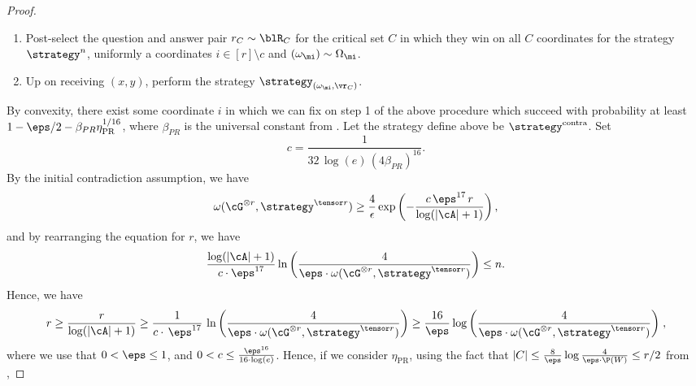 \begin{proof}
	
	\begin{enumerate}
		\item Post-select the question and answer pair $r_{C} \sim \blR_C$ for the critical set $C$ in which they win on all $C$ coordinates for the strategy $\strategy^n$, uniformly a coordinates $i \in [r] \setminus c$ and $(\omega_\mi) \sim \Omega_{\mi}$.  
		\item Up on receiving $(x,y)$, perform the strategy $\strategy_{(\omega_{\mi}, \vr_C)}$.
	\end{enumerate}
	By convexity, there exist some coordinate $i$ in which we can fix on step 1 of the above procedure which succeed with probability at least $1 - \eps/2 - \beta_{PR}  \eta_{\text{PR}}^{1/16}$, where $\beta_{PR} $ is the universal constant from . Let the strategy define above be $\strategy^{\text{contra}}$. Set
	\begin{equation*}
		c = \frac{1}{32 \, \log(e) \, (4\beta_{PR} )^{16}}. 
	\end{equation*}
	By the initial contradiction assumption, we have
	\begin{equation*}
		\omega(\cG^{\otimes r}, \strategy^{\tensor r}) \geq \frac{4}{\epsilon} \exp \left ( - \frac{c \, \eps^{17} \, r}{ \log (|\cA|+1) } \right),
	\end{equation*}
	and by rearranging the equation for $r$, we have
	\begin{equation*}
		\frac{\log (|\cA|+1)}{c \cdot \eps^{17}} \ln{\left(\frac{4}{\eps \cdot \omega(\cG^{\otimes r}, \strategy^{\tensor r} )} \right)} \leq n. 
	\end{equation*}
	Hence, we have 
	\[
	r \geq \frac{r}{\log (|\cA|+1)} \geq \frac{1}{c \cdot \, \eps^{17}} \,  \ln{\left(\frac{4}{\eps \cdot \omega(\cG^{\otimes r}, \strategy^{\tensor r} )} \right)} \geq \frac{16}{\eps} \log{\left(\frac{4}{\eps \cdot \omega(\cG^{\otimes r}, \strategy^{\tensor r} )} \right)}\;,
	\]
	where we use that $0 < \eps \leq 1$, and $0 < c \leq \frac{\eps^{16}}{16 \cdot \log(e)}$. Hence, if we consider $\eta_{\text{PR}}$, using the fact that $|C| \leq \frac{8}{\eps} \log \frac{4}{\eps \cdot \P(W)} \leq r/2$ from ,

\end{proof}
